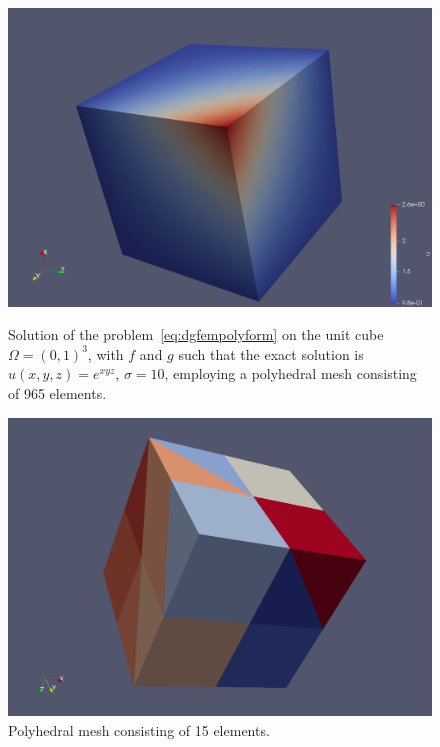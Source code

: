 \documentclass[12pt, a4paper]{article}
\theoremstyle{definition}
\theoremstyle{plain}
\theoremstyle{plain}
\theoremstyle{definition}
\begin{document}
\begin{figure}[h!] 
	\centering
	\includegraphics[scale=0.15]{solution_3072p}
	\caption{Solution of the problem~\eqref{eq:dgfempolyform} on the unit cube 
	$\Omega = (0,1)^3$, with $f$ and $g$ such that the exact solution is 
	$u(x,y,z)=e^{xyz}$, $\sigma=10$, employing a polyhedral mesh consisting of 
	965 elements.}
	\label{fig:sol}
	\includegraphics[scale=0.30]{mesh_48p}
	\caption{Polyhedral mesh consisting of 15 elements.}
	\label{fig:mesh}
\end{figure}
\end{document}
